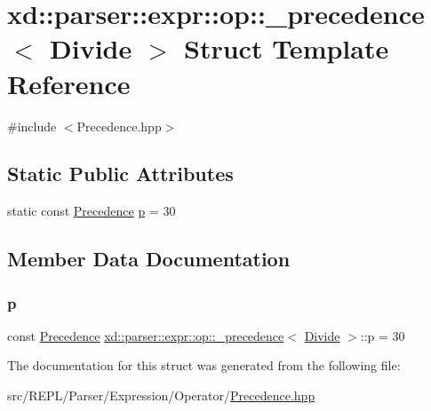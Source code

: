 \hypertarget{structxd_1_1parser_1_1expr_1_1op_1_1__precedence_3_01_divide_01_4}{}\section{xd\+:\+:parser\+:\+:expr\+:\+:op\+:\+:\+\_\+precedence$<$ Divide $>$ Struct Template Reference}
\label{structxd_1_1parser_1_1expr_1_1op_1_1__precedence_3_01_divide_01_4}


{\ttfamily \#include $<$Precedence.\+hpp$>$}

\subsection*{Static Public Attributes}
\begin{DoxyCompactItemize}
\item 
static const \mbox{\hyperlink{namespacexd_1_1parser_1_1expr_1_1op_ae27abd4a02cd8125663cb2bacac299b2}{Precedence}} \mbox{\hyperlink{structxd_1_1parser_1_1expr_1_1op_1_1__precedence_3_01_divide_01_4_a0c5533e41ad3505a0bb1818678042dfd}{p}} = 30
\end{DoxyCompactItemize}


\subsection{Member Data Documentation}
\mbox{\label{structxd_1_1parser_1_1expr_1_1op_1_1__precedence_3_01_divide_01_4_a0c5533e41ad3505a0bb1818678042dfd}} 
\subsubsection{\texorpdfstring{p}{p}}
{\footnotesize\ttfamily const \mbox{\hyperlink{namespacexd_1_1parser_1_1expr_1_1op_ae27abd4a02cd8125663cb2bacac299b2}{Precedence}} \mbox{\hyperlink{structxd_1_1parser_1_1expr_1_1op_1_1__precedence}{xd\+::parser\+::expr\+::op\+::\+\_\+precedence}}$<$ \mbox{\hyperlink{structxd_1_1parser_1_1expr_1_1op_1_1_divide}{Divide}} $>$\+::p = 30\hspace{0.3cm}{\ttfamily [static]}}



The documentation for this struct was generated from the following file\+:\begin{DoxyCompactItemize}
\item 
src/\+R\+E\+P\+L/\+Parser/\+Expression/\+Operator/\mbox{\hyperlink{_precedence_8hpp}{Precedence.\+hpp}}\end{DoxyCompactItemize}
